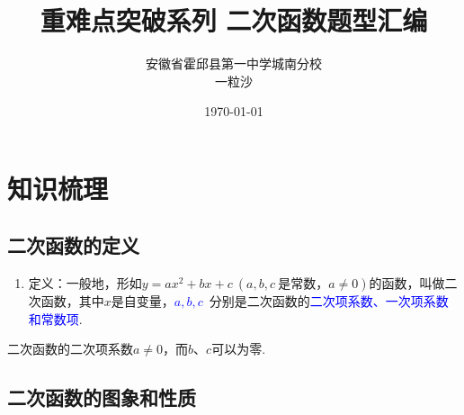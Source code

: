 \documentclass[10pt]{ctexart}
\title{重难点突破系列 \quad 二次函数题型汇编}
\author{安徽省霍邱县第一中学城南分校\\一粒沙}
\date{\today}
\begin{document}
\maketitle
\tableofcontents

\section{知识梳理}
\subsection{二次函数的定义}
\begin{enumerate}
\item 定义：一般地，形如$y=ax^2+bx+c~(a,b,c~\text{是常数，}a\neq 0)$的函数，叫做二次函数，其中$x$是自变量，\textcolor{blue}{$a,b,c$}~分别是二次函数的\textcolor{blue}{二次项系数、一次项系数和常数项}.
\end{enumerate}
\begin{vuyi}
    二次函数的二次项系数$a\neq 0$，而$b$、$c$可以为零.
\end{vuyi}
\subsection{二次函数的图象和性质}
\end{document}
